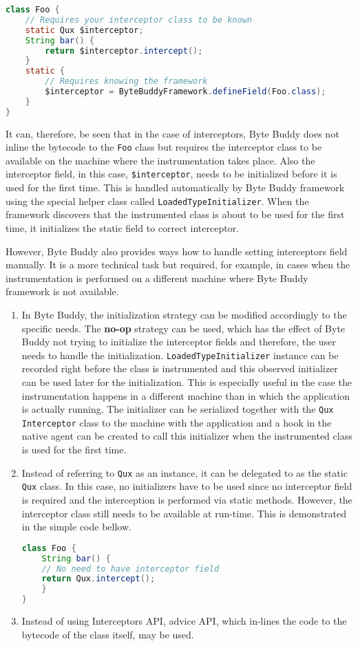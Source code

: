 \begin{lstlisting}[language=Java]
class Foo {
	// Requires your interceptor class to be known
	static Qux $interceptor;
	String bar() {
		return $interceptor.intercept(); 
	}
	static {
		// Requires knowing the framework
		$interceptor = ByteBuddyFramework.defineField(Foo.class);
	}
}
\end{lstlisting}
		
It can, therefore, be seen that in the case of interceptors, Byte Buddy does not inline the bytecode to the \texttt{Foo} class but requires the interceptor class to be available on the machine where the instrumentation takes place. Also the interceptor field, in this case, \texttt{\$interceptor}, needs to be initialized before it is used for the first time. This is handled automatically by Byte Buddy framework using the special helper class called \texttt{LoadedTypeInitializer}. When the framework discovers that the instrumented class is about to be used for the first time, it initializes the static field to correct interceptor.

However, Byte Buddy also provides ways how to handle setting interceptors field manually. It is a more technical task but required, for example, in cases when the instrumentation is performed on a different machine where Byte Buddy framework is not available.
\begin{enumerate}
\item In Byte Buddy, the initialization strategy can be modified accordingly to the specific needs. The \textbf{no-op} strategy can be used, which has the effect of Byte Buddy not trying to initialize the interceptor fields and therefore, the user needs to handle the initialization. \texttt{LoadedTypeInitializer} instance can be recorded right before the class is instrumented and this observed initializer can be used later for the initialization. This is especially useful in the case the instrumentation happens in a different machine than in which the application is actually running. The initializer can be serialized together with the \texttt{Qux} \texttt{Interceptor} class to the machine with the application and a hook in the native agent can be created to call this initializer when the instrumented class is used for the first time.

\item Instead of referring to \texttt{Qux} as an instance, it can be delegated to as the static \texttt{Qux} class. In this case, no initializers have to be used since no interceptor field is required and the interception is performed via static methods. However, the interceptor class still needs to be available at run-time. This is demonstrated in the simple code bellow.

\begin{lstlisting}[language=Java]
class Foo {
	String bar() {
	// No need to have interceptor field
	return Qux.intercept(); 
	}
}
\end{lstlisting}

\item Instead of using Interceptors API, advice API, which in-lines the code to the bytecode of the class itself, may be used.
\end{enumerate}


